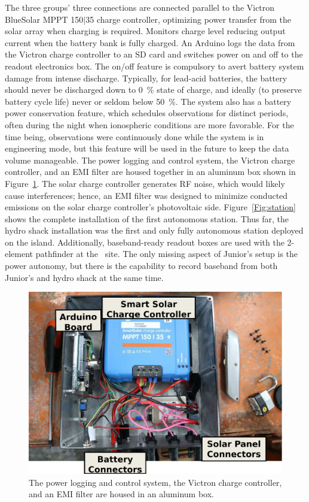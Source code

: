 The three groups' three connections are connected parallel to the Victron BlueSolar MPPT 150$\vert$35 charge controller, optimizing power transfer from the solar array when charging is required. Monitors charge level reducing output current when the battery bank is fully charged. An Arduino logs the data from the Victron charge controller to an SD card and switches power on and off to the readout electronics box. The on/off feature is compulsory to avert battery system damage from intense discharge. Typically, for lead-acid batteries, the battery should never be discharged down to \SI{0}{\percent} state of charge, and ideally (to preserve battery cycle life) never or seldom below \SI{50}{\percent}. The system also has a battery power conservation feature, which schedules observations for distinct periods, often during the night when ionospheric conditions are more favorable. For the time being, observations were continuously done while the system is in engineering mode, but this feature will be used in the future to keep the data volume manageable. The power logging and control system, the Victron charge controller, and an EMI filter are housed together in an aluminum box shown in Figure~\ref{Fig:power_box_interior}. The solar charge controller generates RF noise, which would likely cause interferences; hence, an EMI filter was designed to minimize conducted emissions on the solar charge controller's photovoltaic side. Figure~\ref{Fig:station} shows the complete installation of the first autonomous station. Thus far, the hydro shack installation was the first and only fully autonomous station deployed on the island. Additionally, baseband-ready readout boxes are used with the 2-element pathfinder at the \prizm\ site. The only missing aspect of Junior's setup is the power autonomy, but there is the capability to record baseband from both Junior's and hydro shack at the same time.

\begin{figure}
	\centering
	\includegraphics[width=\linewidth]{Figures/power_box_interior}
	\caption{The power logging and control system, the Victron charge controller, and an EMI filter are housed in an aluminum box.}
	\label{Fig:power_box_interior}
\end{figure}

